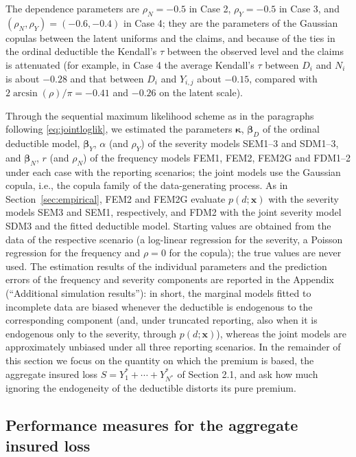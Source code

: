 \documentclass[11pt]{article}
\newcommand{\rev}[1]{{\color{blue}#1}}
\begin{document}
\rev{The dependence parameters are $\rho_N=-0.5$ in Case 2, $\rho_Y=-0.5$ in Case 3, and $(\rho_N,\rho_Y)=(-0.6,-0.4)$ in Case 4; they are the parameters of the Gaussian copulas between the latent uniforms and the claims, and because of the ties in the ordinal deductible the Kendall's $\tau$ between the observed level and the claims is attenuated (for example, in Case 4 the average Kendall's $\tau$ between $D_i$ and $N_i$ is about $-0.28$ and that between $D_i$ and $Y_{i,j}$ about $-0.15$, compared with $2\arcsin(\rho)/\pi=-0.41$ and $-0.26$ on the latent scale).}

Through the sequential maximum likelihood scheme as in the paragraphs following  \eqref{eq:jointloglik}, we estimated the parameters \rev{$\bm{\kappa}$, $\bm{\beta}_D$ of the ordinal deductible model, $\bm{\beta}_Y$, $\alpha$ (and $\rho_Y$) of the severity models SEM1--3 and SDM1--3, and $\bm{\beta}_N$, $r$ (and $\rho_N$) of the frequency models FEM1, FEM2, FEM2G and FDM1--2} under each case with the reporting scenarios\rev{; the joint models use the Gaussian copula, i.e., the copula family of the data-generating process. As in Section~\ref{sec:empirical}, FEM2 and FEM2G evaluate $p(d;\bm{x})$ with the severity models SEM3 and SEM1, respectively, and FDM2 with the joint severity model SDM3 and the fitted deductible model. Starting values are obtained from the data of the respective scenario (a log-linear regression for the severity, a Poisson regression for the frequency and $\rho=0$ for the copula); the true values are never used.} \rev{The estimation results of the individual parameters and the prediction errors of the frequency and severity components are reported in the Appendix (``Additional simulation results''): in short, the marginal models fitted to incomplete data are biased whenever the deductible is endogenous to the corresponding component (and, under truncated reporting, also when it is endogenous only to the severity, through $p(d;\bm{x})$), whereas the joint models are approximately unbiased under all three reporting scenarios. In the remainder of this section we focus on the quantity on which the premium is based, the aggregate insured loss $S=Y^*_1+\cdots+Y^*_{N^*}$ of Section 2.1, and ask how much ignoring the endogeneity of the deductible distorts its pure premium.}

\subsection{\rev{Performance measures for the aggregate insured loss}}\label{sec:simSmeasure}
\end{document}
